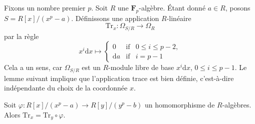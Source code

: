 \medskip\noindent Fixons un nombre premier $p$. Soit $R$ une $\mathbf{F}_p$-algèbre. Étant donné $a \in R$, posons $S = R[x]/(x^p - a)$. Définissons une application $R$-linéaire $$
\text{Tr}_x : \Omega_{S/R} \longrightarrow \Omega_R
$$ par la règle $$
x^i\text{d}x \longmapsto
\left\{
\begin{matrix}
0 & \text{if} & 0 \leq i \leq p - 2, \\
\text{d}a & \text{if} & i = p - 1
\end{matrix}
\right.
$$ Cela a un sens, car $\Omega_{S/R}$ est un $R$-module libre de base $x^i\text{d}x$, $0 \leq i \leq p - 1$. Le lemme suivant implique que l'application trace est bien définie, c'est-à-dire indépendante du choix de la coordonnée $x$.

\begin{lemma} \label{lemma-trace-well-defined} Soit $\varphi : R[x]/(x^p - a) \to R[y]/(y^p - b)$ un homomorphisme de $R$-algèbres. Alors $\text{Tr}_x = \text{Tr}_y \circ \varphi$. \end{lemma}

